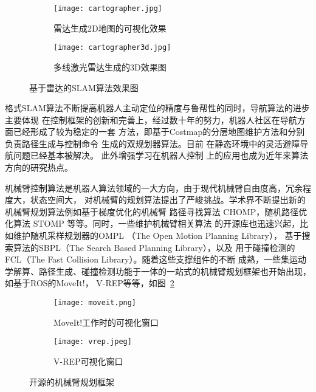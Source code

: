 \begin{figure}
\centering
\begin{subfigure}{.5\textwidth}
  \centering
  \texttt{[image: cartographer.jpg]}
  \caption{雷达生成2D地图的可视化效果}
\end{subfigure}%
\begin{subfigure}{.5\textwidth}
  \centering
  \texttt{[image: cartographer3d.jpg]}
  \caption{多线激光雷达生成的3D效果图}
\end{subfigure}
\caption{基于雷达的SLAM算法效果图}
\label{fig:lidar_slams}
\end{figure}


格式SLAM算法不断提高机器人主动定位的精度与鲁帮性的同时，导航算法的进步主要体现
在控制框架的创新和完善上，经过数十年的努力，机器人社区在导航方面已经形成了较为稳定的一套
方法，即基于Costmap的分层地图维护方法\cite{lu2014layered}和分别负责路径生成与控制命令
生成的双规划器算法\cite{guimaraes2016ros}。目前
在静态环境中的灵活避障导航问题已经基本被解决\cite{Zhou2017A}。 此外增强学习在机器人控制
上的应用也成为近年来算法方向的研究热点\cite{schaal2002learning}。

机械臂控制算法是机器人算法领域的一大方向，由于现代机械臂自由度高，冗余程度大，状态空间大，
对机械臂的规划算法提出了严峻挑战。学术界不断提出新的机械臂规划算法例如基于梯度优化的机械臂
路径寻找算法 CHOMP\cite{ratliff2009chomp}，随机路径优化算法 STOMP\cite{kalakrishnan2011stomp}
等等。同时，一些维护机械臂相关算法 的开源库也迅速兴起，比如维护随机采样规划器的OMPL
（The Open Motion Planning Library）\cite{sucan2010open}，
基于搜索算法的SBPL（The Search Based Planning Library）\cite{likhachev2014sbpl}，以及
用于碰撞检测的FCL（The Fast Collision Library）\cite{pan2012fcl}。随着这些支撑组件的不断
成熟，一些集运动学解算、路径生成、碰撞检测功能于一体的一站式的机械臂规划框架也开始出现，
如基于ROS的MoveIt!\cite{chitta2012moveit}， V-REP等等，如图~\ref{fig:moveit_vrep}

\begin{figure}
\centering
\begin{subfigure}{.5\textwidth}
  \centering
  \texttt{[image: moveit.png]}
  \caption{MoveIt!工作时的可视化窗口}
\end{subfigure}%
\begin{subfigure}{.5\textwidth}
  \centering
  \texttt{[image: vrep.jpeg]}
  \caption{V-REP可视化窗口}
\end{subfigure}
\caption{开源的机械臂规划框架}
\label{fig:moveit_vrep}
\end{figure}


